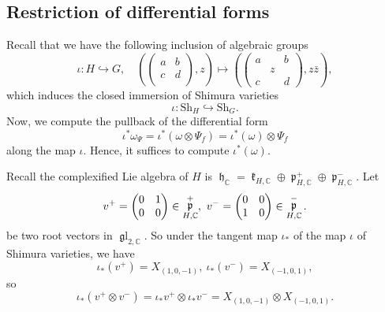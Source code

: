 \documentclass[11pt, a4paper]{amsart}
\theoremstyle{plain}
\theoremstyle{definition}
\numberwithin{equation}{section}
\def\CC{\mathbb{C}}
\DeclareMathOperator{\liek}{\mathfrak k}
\DeclareMathOperator{\lieh}{\mathfrak h}
\DeclareMathOperator{\liep}{\mathfrak p}
\DeclareMathOperator{\liegl}{\mathfrak gl}
\newcommand{\Sh}{\mathrm{Sh}}
\begin{document}
\subsection{Restriction of differential forms}
\label{SS: res of the diff form}

Recall that we have the following inclusion of algebraic groups 
\[
    \iota\colon H \hookrightarrow G,  \quad (\begin{pmatrix} 
                                            a & b \\
                                            c & d \\
                                         \end{pmatrix}, z) \mapsto (\begin{pmatrix}
                                                                        a & & b \\
                                                                        & z & \\
                                                                        c & & d 
                                                                     \end{pmatrix}, z\bar{z}), 
\]
which induces the closed immersion of Shimura varieties 
\[
    \iota \colon \Sh_{H} \hookrightarrow \Sh_{G}. 
\]
Now, we compute the pullback of the differential form 
\begin{equation*}
    \iota^{*} \omega_{\Psi} = \iota^{*} (\omega \otimes \Psi_f) = \iota^{*}(\omega) \otimes \Psi_{f}
\end{equation*}
along the map $\iota$. Hence, it suffices to compute $\iota^{*}(\omega)$. 
\par Recall the complexified Lie algebra of $H$ is $\lieh_{\CC} = \liek_{H, \CC} \oplus \liep_{H, \CC}^{+} \oplus \liep_{H, \CC}^{-}$. Let 
\begin{equation}
\label{eq: def of v^{+} and v^{-}}
    v^{+} = \begin{pmatrix}
                0 & 1 \\
                0 & 0 
            \end{pmatrix} \in \liep_{H, \CC}^{+},\ v^{-} = \begin{pmatrix}
                                                                    0 & 0 \\
                                                                    1 & 0
                                                            \end{pmatrix} \in \liep_{H, \CC}^{-} . 
\end{equation}
be two root vectors in $\liegl_{2, \CC}$. So under the tangent map $\iota_{*}$ of the map $\iota$ of Shimura varieties, we have 
\begin{equation*}
    \iota_{*}(v^{+}) = X_{(1, 0, -1)}, \  \iota_{*}(v^{-}) = X_{(-1, 0, 1)}, 
\end{equation*}
so
\begin{equation*}
    \iota_{*} (v^{+} \otimes v^{-}) = \iota_{*}v^{+} \otimes \iota_{*} v^{-} = X_{(1, 0, -1)} \otimes X_{(-1, 0, 1)}.
\end{equation*}
\end{document}

